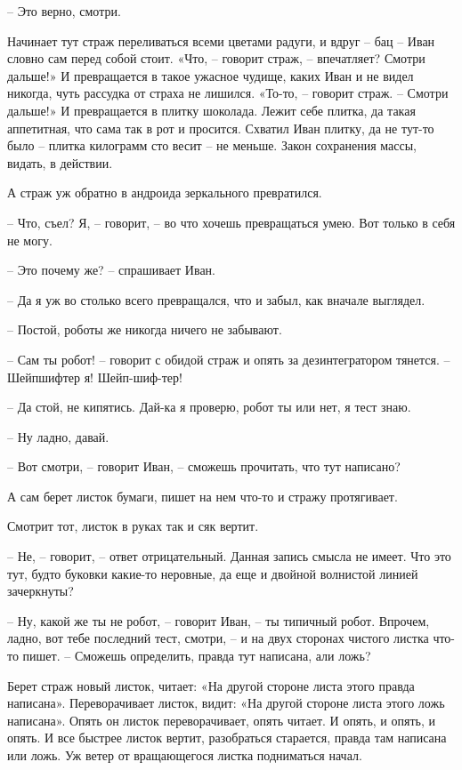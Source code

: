\documentclass[ebook,oneside,final,openright]{memoir}
\begin{document}
– Это верно, смотри. \par
\par
Начинает тут страж переливаться всеми цветами радуги, и вдруг – бац – Иван словно сам перед собой стоит. «Что, – говорит страж, – впечатляет? Смотри дальше!» И превращается в такое ужасное чудище, каких Иван и не видел никогда, чуть рассудка от страха не лишился. «То-то, – говорит страж. – Смотри дальше!» И превращается в плитку шоколада. Лежит себе плитка, да такая аппетитная, что сама так в рот и просится. Схватил Иван плитку, да не тут-то было – плитка килограмм сто весит – не меньше. Закон сохранения массы, видать, в действии. \par
\par
А страж уж обратно в андроида зеркального превратился. \par
– Что, съел? Я, – говорит, – во что хочешь превращаться умею. Вот только в себя не могу. \par
– Это почему же? – спрашивает Иван.\par
– Да я уж во столько всего превращался, что и забыл, как вначале выглядел. \par
– Постой, роботы же никогда ничего не забывают. \par
– Сам ты робот! – говорит с обидой страж и опять за дезинтегратором тянется. – Шейпшифтер я! Шейп-шиф-тер! \par
– Да стой, не кипятись. Дай-ка я проверю, робот ты или нет, я тест знаю. \par
– Ну ладно, давай. \par
– Вот смотри, – говорит Иван, – сможешь прочитать, что тут написано? \par
А сам берет листок бумаги, пишет на нем что-то и стражу протягивает. \par
Смотрит тот, листок в руках так и сяк вертит. \par
– Не, – говорит, – ответ отрицательный. Данная запись смысла не имеет. Что это тут, будто буковки какие-то неровные, да еще и двойной волнистой линией зачеркнуты? \par
– Ну, какой же ты не робот, – говорит Иван, – ты типичный робот. Впрочем, ладно, вот тебе последний тест, смотри, – и на двух сторонах чистого листка что-то пишет. – Сможешь определить, правда тут написана, али ложь? \par
\par
Берет страж новый листок, читает: «На другой стороне листа этого правда написана». Переворачивает листок, видит: «На другой стороне листа этого ложь написана». Опять он листок переворачивает, опять читает. И опять, и опять, и опять. И все быстрее листок вертит, разобраться старается, правда там написана или ложь. Уж ветер от вращающегося листка подниматься начал. \par
\end{document}
